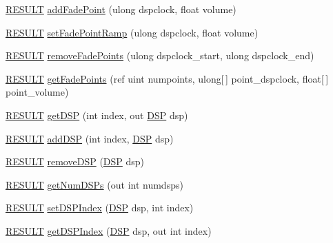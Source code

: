 \begin{DoxyCompactItemize}
\item 
\hyperlink{namespace_f_m_o_d_a305d1176ef3f8c8815861a60407ac33d}{R\+E\+S\+U\+LT} \hyperlink{class_f_m_o_d_1_1_channel_control_ad0454a8820a4429676951e62bd936a7c}{add\+Fade\+Point} (ulong dspclock, float volume)
\item 
\hyperlink{namespace_f_m_o_d_a305d1176ef3f8c8815861a60407ac33d}{R\+E\+S\+U\+LT} \hyperlink{class_f_m_o_d_1_1_channel_control_a9359423a1a32ea9217c5e7c7f12c1a0d}{set\+Fade\+Point\+Ramp} (ulong dspclock, float volume)
\item 
\hyperlink{namespace_f_m_o_d_a305d1176ef3f8c8815861a60407ac33d}{R\+E\+S\+U\+LT} \hyperlink{class_f_m_o_d_1_1_channel_control_a9ffa2be65b332b632094316c67a6c6c5}{remove\+Fade\+Points} (ulong dspclock\+\_\+start, ulong dspclock\+\_\+end)
\item 
\hyperlink{namespace_f_m_o_d_a305d1176ef3f8c8815861a60407ac33d}{R\+E\+S\+U\+LT} \hyperlink{class_f_m_o_d_1_1_channel_control_a325febe78403a408ed6b505594fb101e}{get\+Fade\+Points} (ref uint numpoints, ulong\mbox{[}$\,$\mbox{]} point\+\_\+dspclock, float\mbox{[}$\,$\mbox{]} point\+\_\+volume)
\item 
\hyperlink{namespace_f_m_o_d_a305d1176ef3f8c8815861a60407ac33d}{R\+E\+S\+U\+LT} \hyperlink{class_f_m_o_d_1_1_channel_control_ae082d636e279b1d67c4d434cd5ed6c40}{get\+D\+SP} (int index, out \hyperlink{class_f_m_o_d_1_1_d_s_p}{D\+SP} dsp)
\item 
\hyperlink{namespace_f_m_o_d_a305d1176ef3f8c8815861a60407ac33d}{R\+E\+S\+U\+LT} \hyperlink{class_f_m_o_d_1_1_channel_control_a0ad6d22033d2b0143b22b98e57786dcd}{add\+D\+SP} (int index, \hyperlink{class_f_m_o_d_1_1_d_s_p}{D\+SP} dsp)
\item 
\hyperlink{namespace_f_m_o_d_a305d1176ef3f8c8815861a60407ac33d}{R\+E\+S\+U\+LT} \hyperlink{class_f_m_o_d_1_1_channel_control_a8c2943fa0935e5a60fd549021a4fae29}{remove\+D\+SP} (\hyperlink{class_f_m_o_d_1_1_d_s_p}{D\+SP} dsp)
\item 
\hyperlink{namespace_f_m_o_d_a305d1176ef3f8c8815861a60407ac33d}{R\+E\+S\+U\+LT} \hyperlink{class_f_m_o_d_1_1_channel_control_ae25825a9e260968ea03199ee3dd3c6ff}{get\+Num\+D\+S\+Ps} (out int numdsps)
\item 
\hyperlink{namespace_f_m_o_d_a305d1176ef3f8c8815861a60407ac33d}{R\+E\+S\+U\+LT} \hyperlink{class_f_m_o_d_1_1_channel_control_a90bc0f80cc8890cad1ebb058814e7732}{set\+D\+S\+P\+Index} (\hyperlink{class_f_m_o_d_1_1_d_s_p}{D\+SP} dsp, int index)
\item 
\hyperlink{namespace_f_m_o_d_a305d1176ef3f8c8815861a60407ac33d}{R\+E\+S\+U\+LT} \hyperlink{class_f_m_o_d_1_1_channel_control_aff759fada42a905928f965e759827791}{get\+D\+S\+P\+Index} (\hyperlink{class_f_m_o_d_1_1_d_s_p}{D\+SP} dsp, out int index)

\end{DoxyCompactItemize}
